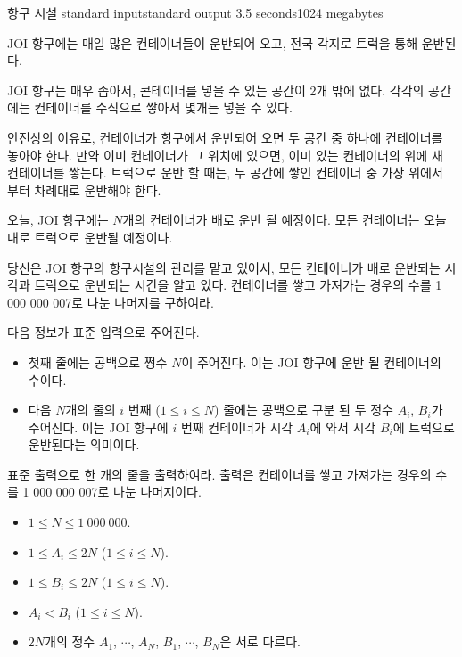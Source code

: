 \begin{problem}{항구 시설}
	{standard input}{standard output}
	{3.5 seconds}{1024 megabytes}{}
	
	JOI 항구에는 매일 많은 컨테이너들이 운반되어 오고, 전국 각지로 트럭을 통해 운반된다.
	
	JOI 항구는 매우 좁아서, 콘테이너를 넣을 수 있는 공간이 2개 밖에 없다. 각각의 공간에는 컨테이너를 수직으로 쌓아서 몇개든 넣을 수 있다.
	
	안전상의 이유로, 컨테이너가 항구에서 운반되어 오면 두 공간 중 하나에 컨테이너를 놓아야 한다. 만약 이미 컨테이너가 그 위치에 있으면, 이미 있는 컨테이너의 위에 새 컨테이너를 쌓는다. 트럭으로 운반 할 때는, 두 공간에 쌓인 컨테이너 중 가장 위에서 부터 차례대로 운반해야 한다.
	
	오늘, JOI 항구에는 $N$개의 컨테이너가 배로 운반 될 예정이다. 모든 컨테이너는 오늘 내로 트럭으로 운반될 예정이다.
	
	당신은 JOI 항구의 항구시설의 관리를 맡고 있어서, 모든 컨테이너가 배로 운반되는 시각과 트럭으로 운반되는 시간을 알고 있다. 컨테이너를 쌓고 가져가는 경우의 수를 1 000 000 007로 나눈 나머지를 구하여라.
	
	\InputFile

다음 정보가 표준 입력으로 주어진다.

\begin{itemize}
	\item 첫째 줄에는 공백으로 쩡수 $N$이 주어진다. 이는 JOI 항구에 운반 될 컨테이너의 수이다.
	\item 다음 $N$개의 줄의 $i$ 번째 ($1 \le i \le N$) 줄에는 공백으로 구분 된 두 정수 $A_i$, $B_i$가 주어진다. 이는 JOI 항구에 $i$ 번째 컨테이너가 시각 $A_i$에 와서 시각 $B_i$에 트럭으로 운반된다는 의미이다.
\end{itemize}


\OutputFile

표준 출력으로 한 개의 줄을 출력하여라. 출력은 컨테이너를 쌓고 가져가는 경우의 수를 1 000 000 007로 나눈 나머지이다.

\Constraints

\begin{itemize}
	
	\item $1 \le N \le 1\ 000\ 000$.
	\item $1 \le A_i \le 2N$ ($1 \le i \le N$).
	\item $1 \le B_i \le 2N$ ($1 \le i \le N$).
	\item $A_i < B_i$ ($1 \le i \le N$).
	\item $2N$개의 정수 $A_1$, $\cdots$, $A_N$, $B_1$, $\cdots$, $B_N$은 서로 다르다.	
\end{itemize}



\end{problem}
